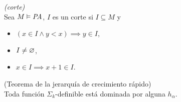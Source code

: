 \begin{defn} \textit{(corte)}\\
    Sea $M\vDash\textit{PA}$, $I$ es un corte si $I\subseteq M$ y 
    \begin{itemize}
        \item $(x\in I\land y<x)\implies y\in I$,
        \item $I\neq\varnothing$,
        \item $x\in I\implies x+1\in I$.
    \end{itemize}
\end{defn}

\begin{lem} \label{LEMAAUX3} (Teorema de la jerarquía de crecimiento rápido)\\
    Toda función $\Sigma_k$-definible está dominada por alguna $h_\alpha$.
\end{lem}
